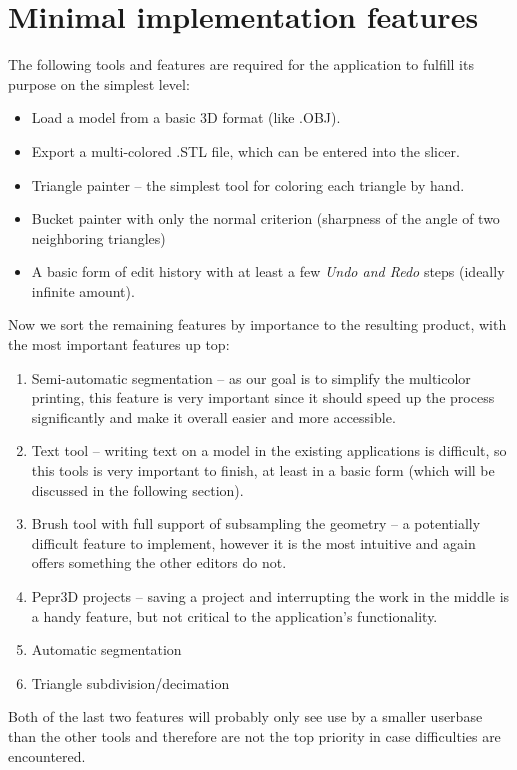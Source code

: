\section{Minimal implementation features}

The following tools and features are required for the application to fulfill its purpose on the simplest level:

\begin{itemize}
\item Load a model from a basic 3D format (like .OBJ).
\item Export a multi-colored .STL file, which can be entered into the slicer.
\item Triangle painter -- the simplest tool for coloring each triangle by hand.
\item Bucket painter with only the normal criterion (sharpness of the angle of two neighboring triangles)
\item A basic form of edit history with at least a few \textit{Undo and Redo} steps (ideally infinite amount).
\end{itemize}

Now we sort the remaining features by importance to the resulting product, with the most important features up top:
\begin{enumerate}
\item Semi-automatic segmentation -- as our goal is to simplify the multicolor printing, this feature is very important since it should speed up the process significantly and make it overall easier and more accessible.
\item Text tool -- writing text on a model in the existing applications is difficult, so this tools is very important to finish, at least in a basic form (which will be discussed in the following section).
\item Brush tool with full support of subsampling the geometry -- a potentially difficult feature to implement, however it is the most intuitive and again offers something the other editors do not.
\item Pepr3D projects -- saving a project and interrupting the work in the middle is a handy feature, but not critical to the application's functionality.
\item Automatic segmentation
\item Triangle subdivision/decimation
\end{enumerate}

Both of the last two features will probably only see use by a smaller userbase than the other tools and therefore are not the top priority in case difficulties are encountered.

